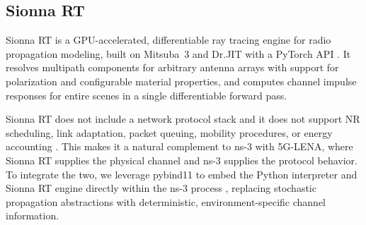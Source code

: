 \subsection{Sionna RT}
Sionna RT is a GPU-accelerated, differentiable ray tracing engine for radio propagation modeling, built on Mitsuba~3 and Dr.JIT with a PyTorch API \cite{sionna,sionnart}.
It resolves multipath components for arbitrary antenna arrays with support for polarization and configurable material properties, and computes channel impulse responses for entire scenes in a single differentiable forward pass.

Sionna RT does not include a network protocol stack and it does not support NR scheduling, link adaptation, packet queuing, mobility procedures, or energy accounting \cite{sionna,sionnart}.
This makes it a natural complement to ns-3 with 5G-LENA, where Sionna RT supplies the physical channel and ns-3 supplies the protocol behavior.
To integrate the two, we leverage pybind11 to embed the Python interpreter and Sionna RT engine directly within the ns-3 process \cite{pybind11}, replacing stochastic propagation abstractions with deterministic, environment-specific channel information.

